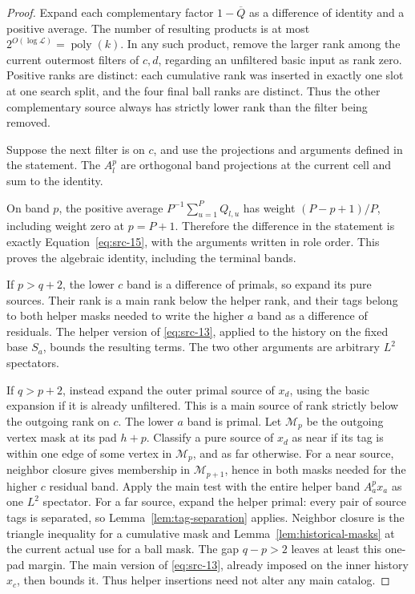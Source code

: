 \begin{proof}
Expand each complementary factor $1-\overline Q$ as a difference of
identity and a positive average.  The number of resulting products is
at most $2^{O(\log\mathcal L)}=\operatorname{poly}(k)$.  In any such
product, remove the larger rank among the current outermost filters of
$c,d$, regarding an unfiltered basic input as rank zero.  Positive
ranks are distinct: each cumulative rank was inserted in exactly one
slot at one search split, and the four final ball ranks are distinct.
Thus the other complementary source always has strictly lower rank
than the filter being removed.

Suppose the next filter is on $c$, and use the projections and arguments
defined in the statement.  The $A_l^p$ are orthogonal band projections
at the current cell and sum to the identity.

On band $p$, the positive average $P^{-1}\sum_{u=1}^P Q_{l,u}$ has
weight $(P-p+1)/P$, including weight zero at $p=P+1$.  Therefore the
difference in the statement is exactly Equation~\eqref{eq:src-15},
with the arguments written in role order.
This proves the algebraic identity, including the terminal bands.

If $p>q+2$, the lower $c$ band is a difference of primals, so expand
its pure sources.  Their rank is a main rank below the helper rank,
and their tags belong to both helper masks needed to write the higher
$a$ band as a difference of residuals.  The helper version of
\eqref{eq:src-13}, applied to the history on the fixed base $S_a$,
bounds the resulting terms.  The two other arguments are arbitrary
$L^2$ spectators.

If $q>p+2$, instead expand the outer primal source of $x_d$, using the
basic expansion if it is already unfiltered.  This is a main source
of rank strictly below the outgoing rank on $c$.  The lower $a$ band
is primal.  Let $\mathcal M_p$ be the outgoing vertex mask at its pad
$h+p$.  Classify a pure source of $x_d$ as near if its tag is within
one edge of some vertex in $\mathcal M_p$, and as far otherwise.
For a near source, neighbor closure gives membership in
$\mathcal M_{p+1}$, hence in both masks needed for the higher $c$
residual band.  Apply the main test with the entire helper band
$A_a^p x_a$ as one $L^2$ spectator.  For a far source, expand the
helper primal: every pair of source tags is separated, so
Lemma~\ref{lem:tag-separation} applies.  Neighbor closure is the
triangle inequality for a cumulative mask and
Lemma~\ref{lem:historical-masks} at the current actual use for a
ball mask.  The gap
$q-p>2$ leaves at least this one-pad margin.  The main version of
\eqref{eq:src-13}, already imposed on the inner history $x_c$, then
bounds it.  Thus helper insertions need not alter any main catalog.


\end{proof}
